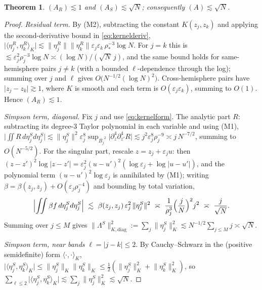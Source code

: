 \documentclass[11pt,reqno]{amsart}
\newtheorem{theorem}{Theorem}[section]
\theoremstyle{definition}
\newcommand{\inner}[2]{\langle #1,#2\rangle}
\newcommand{\eps}{\varepsilon}
\newcommand{\ol}{\overline}
\newcommand{\abs}[1]{\lvert #1\rvert}
\newcommand{\rp}{\rho}
\newcommand{\lesss}{\lesssim}
\begin{document}
\begin{theorem}\label{thm:Asqrt}
$(A_R)\lesss1$ and $(A_S)\lesss\sqrt N$; consequently $(A)\lesss\sqrt N$.
\end{theorem}

\begin{proof}
\emph{Residual term.} By (M2), subtracting the constant $K(z_j,z_k)$ and applying the second-derivative
bound in \eqref{eq:kernelderiv},
$\lvert\inner{\eta_j^{R}}{\eta_k^{R}}_K\rvert\lesss\lVert\eta_j^R\rVert\lVert\eta_k^R\rVert
\eps_j\eps_k\,\rp_\ast^{-3}\log N$. For $j=k$ this is $\lesss\eps_j^2\rp_j^{-3}\log N\asymp
(\log N)/(\sqrt N\,j)$, and the same bound holds for same-hemisphere pairs $j\ne k$ (with a bounded
$\ell$-dependence through the log); summing over $j$ and $\ell$ gives $O\!\bigl(N^{-1/2}(\log N)^2\bigr)$.
Cross-hemisphere pairs have $\abs{z_j-z_k}\gtrsim1$, where $K$ is smooth and each term is
$O(\eps_j\eps_k)$, summing to $O(1)$. Hence $(A_R)\lesss1$.

\emph{Simpson term, diagonal.} Fix $j$ and use \eqref{eq:kernelform}. The analytic part $R$: subtracting
its degree-$3$ Taylor polynomial in each variable and using (M1),
$\lvert\iint R\,d\eta_j^{S}d\eta_j^{S}\rvert\lesss\lVert\eta_j^S\rVert^2\eps_j^{8}\sup_{\ol{B_j}^2}
\lvert\partial_z^4\partial_{z'}^4R\rvert\lesss j^2\eps_j^8\rp_j^{-9}\asymp j\,N^{-7/2}$, summing to
$O(N^{-5/2})$. For the singular part, rescale $z=z_j+\eps_j u$: then
$(z-z')^2\log\abs{z-z'}=\eps_j^2(u-u')^2(\log\eps_j+\log\abs{u-u'})$, and the polynomial term
$(u-u')^2\log\eps_j$ is annihilated by (M1); writing $\beta=\beta(z_j,z_j)+O(\eps_j\rp_j^{-4})$ and
bounding by total variation,
\[
   \Bigl\lvert\iint \beta f\,d\eta_j^{S}d\eta_j^{S}\Bigr\rvert
   \ \lesss\ \beta(z_j,z_j)\,\eps_j^{2}\,\lVert\eta_j^{S}\rVert^2
   \ \asymp\ \frac{1}{\rp_j^{3}}\Bigl(\frac{j}{N}\Bigr)^{2}j^{2}\ \asymp\ \frac{j}{\sqrt N}.
\]
Summing over $j\le M$ gives $\lVert\Lambda^{S}\rVert_{K,\mathrm{diag}}^2:=\sum_j\lVert\eta_j^S\rVert_K^2
\lesss N^{-1/2}\sum_{j\le M}j\asymp\sqrt N$.

\emph{Simpson term, near bands} $\ell=\abs{j-k}\le2$. By Cauchy--Schwarz in the (positive semidefinite)
form $\inner{\cdot}{\cdot}_K$, $\lvert\inner{\eta_j^S}{\eta_k^S}_K\rvert\le\lVert\eta_j^S\rVert_K
\lVert\eta_k^S\rVert_K\le\tfrac12(\lVert\eta_j^S\rVert_K^2+\lVert\eta_k^S\rVert_K^2)$, so
$\sum_{\ell\le2}\lvert\inner{\eta_j^S}{\eta_k^S}_K\rvert\lesss\sum_j\lVert\eta_j^S\rVert_K^2\lesss\sqrt N$.


\end{proof}
\end{document}
